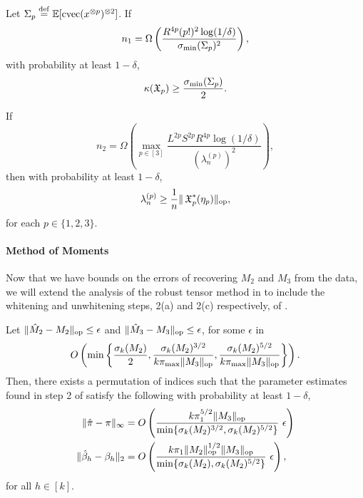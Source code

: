 

\begin{lemma}
\label{lem:lowRankLower}
Let $\Sigma_p \stackrel{\rm def}{=} \operatorname{\mathbb{E}}[\operatorname{cvec}(x^{\otimes p})^{\otimes 2}]$.
If $$n_1 = \Omega \left(\frac{R^{4p} (p!)^2 \log(1/\delta)}{\sigma_\text{\rm min}(\Sigma_p)^2} \right),$$
with probability at least $1-\delta$,
$$\kappa(\operatorname{\mathfrak{X}}_p) \ge \frac{\sigma_\text{\rm min}(\Sigma_p)}{2}.$$
\end{lemma}


\begin{lemma}
\label{lem:lowRankUpper}
If $$n_2 = \Omega \left(\max_{p\in [3]} \frac{L^{2p} S^{2p} R^{4p} \log(1/\delta)}{\left(\lambda_n^{(p)}\right)^2} \right),$$
then with probability at least $1-\delta$,
$$\lambda_n^{(p)} \ge \frac1{n} \|\operatorname{\mathfrak{X}}_p^*(\eta_p)\|_{\textrm{op}},$$
for each $p \in \{1,2,3\}$.
\end{lemma}

\paragraph{Method of Moments} 

Now that we have bounds on the errors of recovering $M_2$ and $M_3$ from
the data, we will extend the analysis of the robust tensor method in
\citet{AnandkumarGeHsu2012} to include the whitening and unwhitening
steps, 2(a) and 2(c) respectively, of
.
\begin{lemma}
  \label{lem:tensorPower} Let $\|\hat M_2 - M_2\|_{\textrm{op}} \le \epsilon$ and
  $\|\hat M_3 - M_3\|_{\textrm{op}} \le \epsilon$, for some $\epsilon$ in
  $$O\left( \min\left\{ 
    \frac{\sigma_k(M_2)}{2}, 
    \frac{\sigma_k(M_2)^{3/2}}{k \pi_{\max} \|M_3\|_{\textrm{op}}},
    \frac{\sigma_k(M_2)^{5/2}}{k \pi_{\max} \|M_3\|_{\textrm{op}}} 
    \right\}\right).$$ 
  Then, there exists a permutation of indices such that  the parameter
  estimates found in step 2 of 
  satisfy the following with probability at least $1 - \delta$,
  \begin{align*}
  \|\hat \pi - \pi \|_{\infty}
  &= O\left(\frac{k \pi_1^{5/2}\| {M_3} \|_{\textrm{op}}}{\min\{ \sigma_k(M_2)^{3/2}, \sigma_k(M_2)^{5/2} \}} ~ \epsilon \right) \\
  \|\hat \beta_h - \beta_h\|_2
  &= O\left( \frac{k \pi_1 \|M_2\|_{\textrm{op}}^{1/2} \| {M_3} \|_{\textrm{op}}}{\min\{ \sigma_k(M_2), \sigma_k(M_2)^{5/2} \}}~ \epsilon \right),
  \end{align*}
  for all $h \in [k]$.
\end{lemma}


